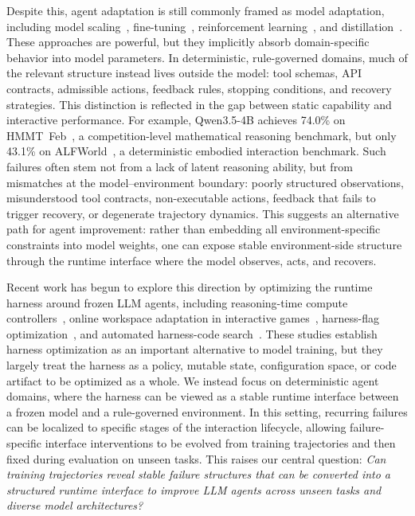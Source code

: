 Despite this, agent adaptation is still commonly framed as model adaptation, including model scaling~\cite{dubey2024llama,qwen2.5}, fine-tuning~\cite{chen2023fireact,prabhakar2026apigen_Salesforce_xLAM2}, reinforcement learning~\cite{guo2025deepseek_Deepseek-r1,qi2025webrl}, and distillation~\cite{kang2026distilling,agarwal2024policy}.
These approaches are powerful, but they implicitly absorb domain-specific behavior into model parameters. 
In deterministic, rule-governed domains, much of the relevant structure instead lives outside the model: tool schemas, API contracts, admissible actions, feedback rules, stopping conditions, and recovery strategies. 
This distinction is reflected in the gap between static capability and interactive performance. 
For example, Qwen3.5-4B achieves 74.0\% on HMMT~Feb~\cite{hmmt2026}, a competition-level mathematical reasoning benchmark, but only 43.1\% on ALFWorld~\cite{shridhar2020alfworld}, a deterministic embodied interaction benchmark. 
Such failures often stem not from a lack of latent reasoning ability, but from mismatches at the model--environment boundary: poorly structured observations, misunderstood tool contracts, non-executable actions, feedback that fails to trigger recovery, or degenerate trajectory dynamics.
This suggests an alternative path for agent improvement: rather than embedding all environment-specific constraints into model weights, one can expose stable environment-side structure through the runtime interface where the model observes, acts, and recovers.

Recent work has begun to explore this direction by optimizing the runtime harness around frozen LLM agents, including reasoning-time compute controllers~\cite{zheng2026llms_AutoTTS_LLMs-Improving-LLMs}, online workspace adaptation in interactive games~\cite{sarafian2026workspace_DREAMTEAM,karten2026continual_Continual-Harness}, harness-flag optimization~\cite{sengupta2026harbor_HARBOR}, and automated harness-code search~\cite{lee2026meta_Meta-harness,lin2026agentic}. 
These studies establish harness optimization as an important alternative to model training, but they largely treat the harness as a policy, mutable state, configuration space, or code artifact to be optimized as a whole. 
We instead focus on deterministic agent domains, where the harness can be viewed as a stable runtime interface between a frozen model and a rule-governed environment. 
In this setting, recurring failures can be localized to specific stages of the interaction lifecycle, allowing failure-specific interface interventions to be evolved from training trajectories and then fixed during evaluation on unseen tasks. 
This raises our central question: \emph{Can training trajectories reveal stable failure structures that can be converted into a structured runtime interface to improve LLM agents across unseen tasks and diverse model architectures?}

